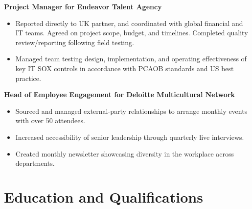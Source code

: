 \documentclass[11pt,letter]{moderncv}
\begin{document}
\textbf{Project Manager for Endeavor Talent Agency}
\begin{itemize}[label=\large\color{color1}{$\bullet$}]
  \item Reported directly to UK partner, and coordinated with global financial
    and IT teams. Agreed on project scope, budget, and timelines.
    Completed quality review/reporting following field testing.
  \item Managed team testing design, implementation, and operating
    effectiveness of key IT SOX controls in accordance with PCAOB standards and
    US best practice.
\end{itemize}
\textbf{Head of Employee Engagement for Deloitte Multicultural Network}
\begin{itemize}[label=\large\color{color1}{$\bullet$}]
  \item Sourced and managed external-party relationships to arrange monthly
    events with over 50 attendees.
\item Increased accessibility of senior leadership through quarterly live
  interviews.
  \item Created monthly newsletter showcasing diversity in the workplace across
    departments.%
\end{itemize}%
%
\section{Education and Qualifications}
\end{document}
